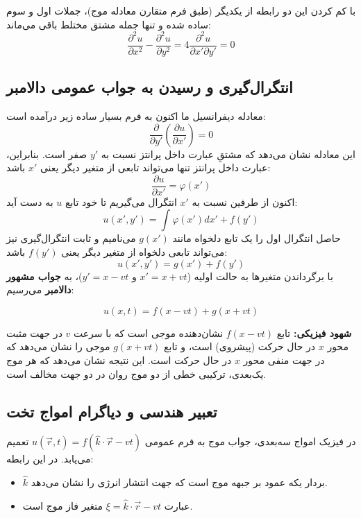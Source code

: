 \documentclass[12pt,a4paper]{article}
\begin{document}
با کم کردن این دو رابطه از یکدیگر (طبق فرم متقارن معادله موج)، جملات اول و سوم ساده شده و تنها جمله مشتق مختلط باقی می‌ماند:
\begin{equation}
    \frac{\partial^2 u}{\partial x^2} - \frac{\partial^2 u}{\partial y^2} = 4 \frac{\partial^2 u}{\partial x' \partial y'} = 0
\end{equation}

\subsection{انتگرال‌گیری و رسیدن به جواب عمومی دالامبر}
معادله دیفرانسیل ما اکنون به فرم بسیار ساده زیر درآمده است:
\begin{equation}
    \frac{\partial}{\partial y'} \left( \frac{\partial u}{\partial x'} \right) = 0
\end{equation}
این معادله نشان می‌دهد که مشتقِ عبارت داخل پرانتز نسبت به $y'$ صفر است. بنابراین، عبارت داخل پرانتز تنها می‌تواند تابعی از متغیر دیگر یعنی $x'$ باشد:
\begin{equation}
    \frac{\partial u}{\partial x'} = \varphi(x')
\end{equation}
اکنون از طرفین نسبت به $x'$ انتگرال می‌گیریم تا خود تابع $u$ به دست آید:
\begin{equation}
    u(x', y') = \int \varphi(x') dx' + f(y')
\end{equation}
حاصل انتگرال اول را یک تابع دلخواه مانند $g(x')$ می‌نامیم و ثابت انتگرال‌گیری نیز می‌تواند تابعی دلخواه از متغیر دیگر یعنی $f(y')$ باشد:
\begin{equation}
    u(x', y') = g(x') + f(y')
\end{equation}
با برگرداندن متغیرها به حالت اولیه ($x' = x+vt$ و $y' = x-vt$)، به \textbf{جواب مشهور دالامبر } می‌رسیم:
\begin{tcolorbox}[colback=green!5,colframe=green!50!black,title=جواب عمومی معادله موج یک‌بعدی]
\begin{equation} \label{eq:dalembert_sol}
    u(x,t) = f(x - vt) + g(x + vt)
\end{equation}
\end{tcolorbox}
\textbf{شهود فیزیکی:} تابع $f(x-vt)$ نشان‌دهنده موجی است که با سرعت $v$ در جهت مثبت محور $x$ در حال حرکت (پیشروی) است، و تابع $g(x+vt)$ موجی را نشان می‌دهد که در جهت منفی محور $x$ در حال حرکت است. این نتیجه نشان می‌دهد که هر موج یک‌بعدی، ترکیبی خطی از دو موج روان در دو جهت مخالف است.

\subsection{تعبیر هندسی و دیاگرام امواج تخت }
در فیزیک امواج سه‌بعدی، جواب موج به فرم عمومی $u(\vec{r}, t) = f(\hat{k} \cdot \vec{r} - vt)$ تعمیم می‌یابد. در این رابطه:
\begin{itemize}
    \item $\hat{k}$ بردار یکه عمود بر جبهه موج است که جهت انتشار انرژی را نشان می‌دهد.
    \item عبارت $\xi = \hat{k} \cdot \vec{r} - vt$ متغیر فاز موج است.
\end{itemize}
\end{document}
